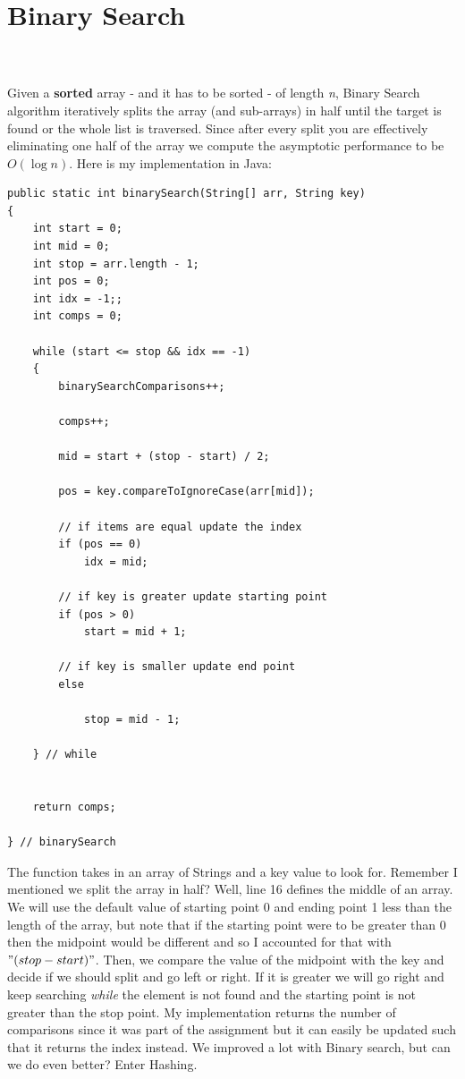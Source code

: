 \documentclass[letterpaper, 10pt]{article}
\begin{document}
\section{Binary Search}
\\
\\
Given a \textbf{sorted} array - and it has to be sorted - of length \textit{n}, Binary Search algorithm iteratively splits the array (and sub-arrays) in half until the target is found or the whole list is traversed. Since after every split you are effectively eliminating one half of the array we compute the asymptotic performance to be $O(\log n)$. Here is my implementation in Java:
\begin{lstlisting}
public static int binarySearch(String[] arr, String key)
{
    int start = 0;
    int mid = 0;
    int stop = arr.length - 1;
    int pos = 0;
    int idx = -1;;
    int comps = 0;
    
    while (start <= stop && idx == -1)
    {
    	binarySearchComparisons++;
    	
    	comps++;
    	
    	mid = start + (stop - start) / 2;
    	
    	pos = key.compareToIgnoreCase(arr[mid]);
    	
    	// if items are equal update the index
    	if (pos == 0)
    		idx = mid;
    	
    	// if key is greater update starting point
    	if (pos > 0)
    		start = mid + 1;
    	
    	// if key is smaller update end point
    	else
    		
    		stop = mid - 1;
    	
    } // while
	
	
    return comps;
    
} // binarySearch
\end{lstlisting}
The function takes in an array of Strings and a key value to look for. Remember I mentioned we split the array in half? Well, line 16 defines the middle of an array. We will use the default value of starting point 0 and ending point 1 less than the length of the array, but note that if the starting point were to be greater than 0 then the midpoint would be different and so I accounted for that with $"(stop - start)"$. Then, we compare the value of the midpoint with the key and decide if we should split and go left or right. If it is greater we will go right and keep searching \textit{while} the element is not found and the starting point is not greater than the stop point. My implementation returns the number of comparisons since it was part of the assignment but it can easily be updated such that it returns the index instead. We improved a lot with Binary search, but can we do even better? Enter Hashing.
\end{document}
